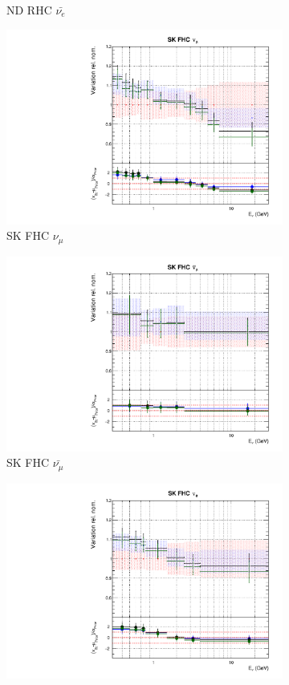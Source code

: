 \begin{figure}
\begin{subfigure}{0.24\textwidth}
  \caption{ND RHC $\bar{\nu_e}$}
\end{subfigure}
\begin{subfigure}{0.24\textwidth}
  \centering
  \includegraphics[width=0.95\linewidth]{figs/polyasmvsflux_8}
  \caption{SK FHC $\nu_{\mu}$}
\end{subfigure}
\begin{subfigure}{0.24\textwidth}
  \centering
  \includegraphics[width=0.95\linewidth]{figs/polyasmvsflux_9}
  \caption{SK FHC $\bar{\nu_{\mu}}$}
\end{subfigure}
\begin{subfigure}{0.24\textwidth}
  \centering
  \includegraphics[width=0.95\linewidth]{figs/polyasmvsflux_10}

\end{subfigure}
\end{figure}
